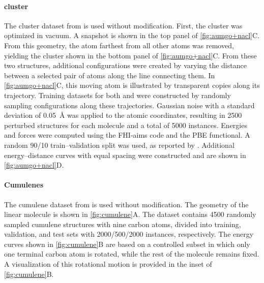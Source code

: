 \documentclass[10pt]{article} %
\begin{document}
\paragraph{ cluster}
The  cluster dataset from \cite{kfgb2021} is used without modification.
First, the  cluster was optimized in vacuum. A snapshot is shown in the top panel of \cref{fig:aumgo+nacl}C. From this geometry, the  atom farthest from all other  atoms was removed, yielding the  cluster shown in the bottom panel of \cref{fig:aumgo+nacl}C.
From these two structures, additional configurations were created by varying the distance between a selected pair of  atoms along the line connecting them. In \cref{fig:aumgo+nacl}C, this moving atom is illustrated by transparent copies along its trajectory.
Training datasets for both  and  were constructed by randomly sampling configurations along these trajectories. Gaussian noise with a standard deviation of \qty{0.05}{\angstrom} was applied to the atomic coordinates, resulting in \num{2500} perturbed structures for each molecule and a total of \num{5000} instances. Energies and forces were computed using the FHI-aims code and the PBE functional.
A random \num{90}/\num{10} train–validation split was used, as reported by \cite{kfgb2021}. Additional energy–distance curves with equal spacing were constructed and are shown in \cref{fig:aumgo+nacl}D.

\paragraph{Cumulenes}
The cumulene dataset from \cite{ucsgpstm2021} is used without modification. The geometry of the linear molecule is shown in \cref{fig:cumulene}A. The dataset contains \num{4500} randomly sampled cumulene structures with nine carbon atoms, divided into training, validation, and test sets with \num{2000}/\num{500}/\num{2000} instances, respectively.
%
The energy curves shown in \cref{fig:cumulene}B are based on a controlled subset in which only one terminal carbon atom is rotated, while the rest of the molecule remains fixed. A visualization of this rotational motion is provided in the inset of \cref{fig:cumulene}B.
\end{document}
